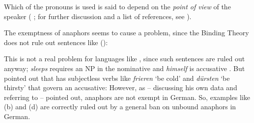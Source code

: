 \documentclass[output=paper,biblatex,babelshorthands,newtxmath,draftmode,colorlinks,citecolor=brown]{langscibook}
\begin{document}
\noindent
Which of the pronouns is used is said to depend on the \emph{point of view} of the speaker
(%
\citealp{Kuroda1973a-u}; for further discussion and a list of references, see \citealp[]{ps2}).


The exemptness of anaphors seems to cause a problem, since the Binding Theory does not rule out sentences like ():
\z
{}

This is not a real problem for languages like , since such sentences are ruled out anyway; \emph{sleeps}
requires an NP in the nominative and \emph{himself} is accusative \parencites[]{Brame77}[]{ps2}.
But \citet[Section~20.4.6]{Mueller99a} pointed out that  has subjectless verbs like \emph{frieren} `be cold' and
\emph{dürsten} `be thirsty' that govern an accusative:
\eal
{}
\zl
However, as \citet[, 161]{Kiss2012a} -- discussing his own data and referring to
\citet[]{Frey93a} -- pointed out, anaphors are not exempt in German. So, examples like
(b) and (d) are correctly ruled out by a general ban on unbound anaphors in German.
\end{document}
